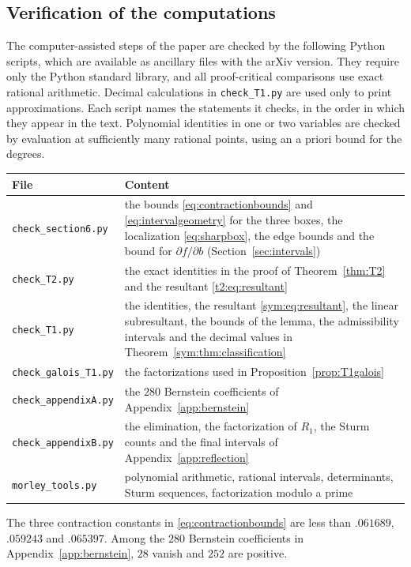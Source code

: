 \documentclass[11pt]{article}
\theoremstyle{definition}
\theoremstyle{remark}
\begin{document}
\begin{appendices}
\section{Verification of the computations}\label{sec:reproducibility}

The computer-assisted steps of the paper are checked by the following Python scripts, which are available as ancillary files with the arXiv version. They require only the Python standard library, and all proof-critical comparisons use exact rational arithmetic. Decimal calculations in \texttt{check\_T1.py} are used only to print approximations. Each script names the statements it checks, in the order in which they appear in the text. Polynomial identities in one or two variables are checked by evaluation at sufficiently many rational points, using an a priori bound for the degrees.

\begin{center}\small
\begin{tabular}{p{}p{}}\toprule
File&Content\\\midrule
\texttt{check\_section6.py}&the bounds \eqref{eq:contractionbounds} and \eqref{eq:intervalgeometry} for the three boxes, the localization \eqref{eq:sharpbox}, the edge bounds and the bound for $\partial f/\partial b$ (Section~\ref{sec:intervals})\\
\texttt{check\_T2.py}&the exact identities in the proof of Theorem~\ref{thm:T2} and the resultant \eqref{t2:eq:resultant}\\
\texttt{check\_T1.py}&the identities, the resultant \eqref{sym:eq:resultant}, the linear subresultant, the bounds of the lemma, the admissibility intervals and the decimal values in Theorem~\ref{sym:thm:classification}\\
\texttt{check\_galois\_T1.py}&the factorizations used in Proposition~\ref{prop:T1galois}\\
\texttt{check\_appendixA.py}&the $280$ Bernstein coefficients of Appendix~\ref{app:bernstein}\\
\texttt{check\_appendixB.py}&the elimination, the factorization of $R_1$, the Sturm counts and the final intervals of Appendix~\ref{app:reflection}\\
\texttt{morley\_tools.py}&polynomial arithmetic, rational intervals, determinants, Sturm sequences, factorization modulo a prime\\\bottomrule
\end{tabular}
\end{center}

The three contraction constants in \eqref{eq:contractionbounds} are less than $.061689$, $.059243$ and $.065397$. Among the $280$ Bernstein coefficients in Appendix~\ref{app:bernstein}, $28$ vanish and $252$ are positive.

\end{appendices}
\end{document}
